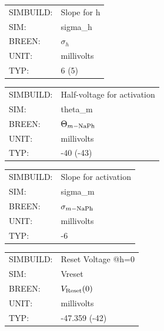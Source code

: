 \documentclass[12pt,openany,oneside]{book}
\begin{document}
\begin{flushleft}
\begin{tabular}{@{}ll@{}}
SIMBUILD: & Slope for h\\
SIM: & sigma\_h\\
BREEN: & $\sigma_h$\\
UNIT: & millivolts\\
TYP: & 6 (5)\\
\end{tabular}
\end{flushleft}
\filbreak
\vspace{\baselineskip}

\begin{flushleft}
\begin{tabular}{@{}ll@{}}
SIMBUILD: & Half-voltage for activation\\
SIM: & theta\_m\\
BREEN: & $\Theta_{m-\rm NaPh}$\\
UNIT: & millivolts\\
TYP: & -40 (-43)\\
\end{tabular}
\end{flushleft}
\filbreak
\vspace{\baselineskip}

\begin{flushleft}
\begin{tabular}{@{}ll@{}}
SIMBUILD: & Slope for activation\\
SIM: & sigma\_m\\
BREEN: & $\sigma_{m-\rm NaPh}$\\
UNIT: & millivolts\\
TYP: & -6\\
\end{tabular}
\end{flushleft}
\filbreak
\vspace{\baselineskip}

\begin{flushleft}
\begin{tabular}{@{}ll@{}}
SIMBUILD: & Reset Voltage @h=0\\
SIM: & Vreset\\
BREEN: & $V_{\rm Reset}(0)$\\
UNIT: & millivolts\\
TYP: & -47.359 (-42)\\
\end{tabular}
\end{flushleft}
\filbreak
\vspace{\baselineskip}
\end{document}
